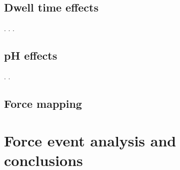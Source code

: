 \section{Dwell time effects}
.
\newpage.
\newpage.
\newpage

\section{pH effects}
.
\newpage.
\newpage

\section{Force mapping}

\chapter{Force event analysis and conclusions}
\newpage